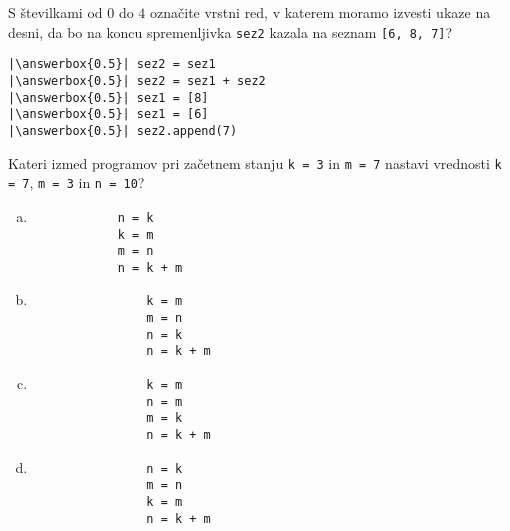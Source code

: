 \documentclass[arhiv, 10pt]{../izpit}
\newcommand{\inlinepy}[1]{\texttt{#1}}
\newcommand{\answerbox}[1]{\framebox{\vphantom{\large M}\hspace{#1cm}}}
\begin{document}
        \naloga*
        \begin{multicols}{2}
        \noindent 
        S številkami od $0$ do $4$ označite vrstni red, v katerem moramo izvesti ukaze na desni, da bo na koncu spremenljivka \inlinepy{sez2} kazala na seznam \inlinepy{[6, 8, 7]}?
    
        \columnbreak
        \noindent
        \begin{verbatim}
|\answerbox{0.5}| sez2 = sez1
|\answerbox{0.5}| sez2 = sez1 + sez2
|\answerbox{0.5}| sez1 = [8]
|\answerbox{0.5}| sez1 = [6]
|\answerbox{0.5}| sez2.append(7)

        \end{verbatim}
        \end{multicols}
    
            
        \naloga*
        
        Kateri izmed programov pri začetnem stanju
            \inlinepy{k = 3} in
            \inlinepy{m = 7}
        nastavi vrednosti
            \inlinepy{k = 7},
            \inlinepy{m = 3} in
            \inlinepy{n = 10}?
    
        \begin{multicols}{4}
        \begin{enumerate}[(a)]
\item 
            \begin{verbatim}
            n = k
            k = m
            m = n
            n = k + m
            \end{verbatim}
        
\item 
                \begin{verbatim}
                k = m
                m = n
                n = k
                n = k + m
                \end{verbatim}
            
\item 
                \begin{verbatim}
                k = m
                n = m
                m = k
                n = k + m
                \end{verbatim}
            
\item 
                \begin{verbatim}
                n = k
                m = n
                k = m
                n = k + m
                \end{verbatim}
            
\end{enumerate}

        \end{multicols}
    
\end{document}
